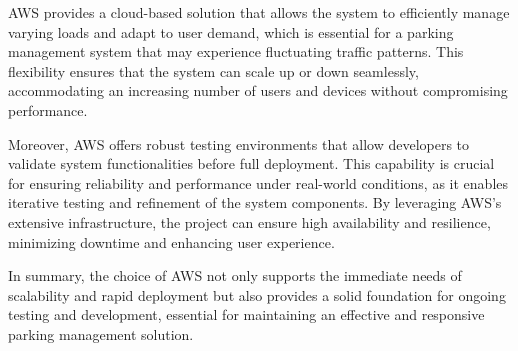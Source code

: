 AWS provides a cloud-based solution that allows the system to efficiently manage varying loads and adapt to user demand, which is essential for a parking management system that may experience fluctuating traffic patterns. This flexibility ensures that the system can scale up or down seamlessly, accommodating an increasing number of users and devices without compromising performance.

Moreover, AWS offers robust testing environments that allow developers to validate system functionalities before full deployment. This capability is crucial for ensuring reliability and performance under real-world conditions, as it enables iterative testing and refinement of the system components. By leveraging AWS's extensive infrastructure, the project can ensure high availability and resilience, minimizing downtime and enhancing user experience. 

In summary, the choice of AWS not only supports the immediate needs of scalability and rapid deployment but also provides a solid foundation for ongoing testing and development, essential for maintaining an effective and responsive parking management solution.


